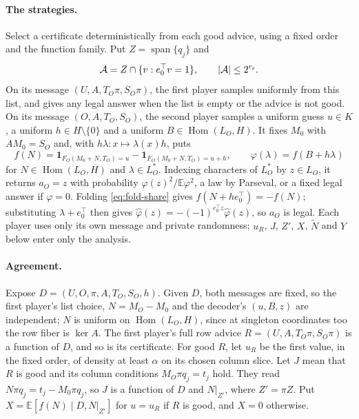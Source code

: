 \documentclass[11pt]{article}
\newcommand{\E}{\mathbb E}
\newcommand{\Hom}{\operatorname{Hom}}
\newcommand{\Span}{\operatorname{span}}
\newcommand{\ind}{\mathbf 1}
\begin{document}
\paragraph{The strategies.}
Select a certificate deterministically from each good advice, using a
fixed order and the function family. Put $Z=\Span\{q_j\}$ and
\begin{equation}\label{eq:answer-list}
 \mathcal A=Z\cap\{v:e_0^\top v=1\},\qquad |\mathcal A|\le2^{r_{\rm s}}.
\end{equation}
On its message $(U,A,T_O\pi,S_O\pi)$, the first player samples uniformly
from this list, and gives any legal answer when the list is empty or the
advice is not good. On its message $(O,A,T_O,S_O)$, the second player
samples a uniform guess $u\in K$, a uniform $h\in H\setminus\{0\}$ and a
uniform $B\in\Hom(L_O,H)$. It fixes $M_0$ with $AM_0=S_O$ and, with
$h\lambda:x\mapsto\lambda(x)h$, puts
\[
 f(N)=\ind_{F_O(M_0+N,T_O)=u}-\ind_{F_O(M_0+N,T_O)=u+h},\qquad
 \varphi(\lambda)=f(B+h\lambda)
\]
for $N\in\Hom(L_O,H)$ and $\lambda\in L_O^*$. Indexing characters of
$L_O^*$ by $z\in L_O$, it returns $a_O=z$ with probability
$\widehat\varphi(z)^2/\E\varphi^2$, a law by Parseval, or a fixed legal
answer if $\varphi=0$. Folding \eqref{eq:fold-share} gives
$f(N+he_0^\top)=-f(N)$; substituting $\lambda+e_0^\top$ then
gives $\widehat\varphi(z)=-(-1)^{e_0^\top z}\widehat\varphi(z)$, so $a_O$
is legal. Each player uses only its own message and private randomness;
$u_R$, $J$, $Z'$, $X$, $\tilde N$ and $Y$ below enter only the analysis.

\paragraph{Agreement.}
Expose $D=(U,O,\pi,A,T_O,S_O,h)$. Given $D$, both messages are fixed,
so the first player's list choice, $N=M_O-M_0$ and the decoder's
$(u,B,z)$ are independent; $N$ is uniform on $\Hom(L_O,H)$, since at
singleton coordinates too the row fiber is $\ker A$. The first player's full row advice
$R=(U,A,T_O\pi,S_O\pi)$ is a function of $D$, and so is its certificate.
For good $R$, let $u_R$ be the first value, in the fixed order, of density
at least $\alpha$ on its chosen column slice. Let $J$ mean that $R$ is good
and its column conditions $M_O\pi q_j=t_j$ hold. They read
$N\pi q_j=t_j-M_0\pi q_j$, so $J$ is a function of $D$ and $N|_{Z'}$, where
$Z'=\pi Z$. Put $X=\E[f(N)\mid D,N|_{Z'}]$ for $u=u_R$ if $R$ is good, and
$X=0$ otherwise.
\end{document}
